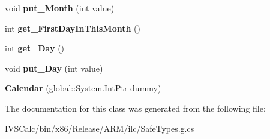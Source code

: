 \begin{DoxyCompactItemize}
\item 
\mbox{\label{class_windows_1_1_globalization_1_1_calendar_aa489ad9c1b3ef84592a314c1e0205442}} 
void {\bfseries put\+\_\+\+Month} (int value)
\item 
\mbox{\label{class_windows_1_1_globalization_1_1_calendar_ae8c451459c992ac6571c711ec788f9d5}} 
int {\bfseries get\+\_\+\+First\+Day\+In\+This\+Month} ()
\item 
\mbox{\label{class_windows_1_1_globalization_1_1_calendar_a1897bf786e640c030ad092f7e8fb21f4}} 
int {\bfseries get\+\_\+\+Day} ()
\item 
\mbox{\label{class_windows_1_1_globalization_1_1_calendar_ac8b804e4a2f0bb7452f39730e8099fb5}} 
void {\bfseries put\+\_\+\+Day} (int value)
\item 
\mbox{\label{class_windows_1_1_globalization_1_1_calendar_a07b463067b430cb089259bc20c5f6e16}} 
{\bfseries Calendar} (global\+::\+System.\+Int\+Ptr dummy)
\end{DoxyCompactItemize}


The documentation for this class was generated from the following file\+:\begin{DoxyCompactItemize}
\item 
I\+V\+S\+Calc/bin/x86/\+Release/\+A\+R\+M/ilc/Safe\+Types.\+g.\+cs\end{DoxyCompactItemize}
